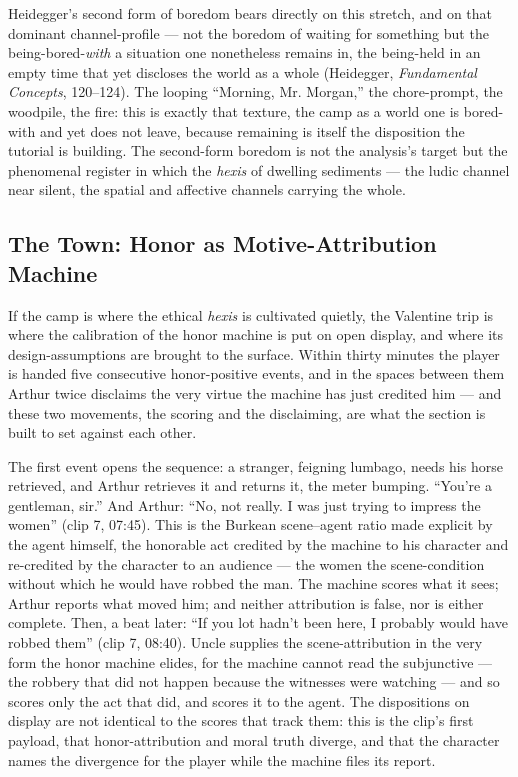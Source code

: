 \documentclass{article}
\begin{document}
Heidegger's second form of boredom bears directly on this stretch, and on that dominant channel-profile — not the boredom of waiting for something but the being-bored-\textit{with} a situation one nonetheless remains in, the being-held in an empty time that yet discloses the world as a whole (Heidegger, \textit{Fundamental Concepts}, 120–124). The looping ``Morning, Mr. Morgan,'' the chore-prompt, the woodpile, the fire: this is exactly that texture, the camp as a world one is bored-with and yet does not leave, because remaining is itself the disposition the tutorial is building. The second-form boredom is not the analysis's target but the phenomenal register in which the \textit{hexis} of dwelling sediments — the ludic channel near silent, the spatial and affective channels carrying the whole.

\bigskip

\subsection*{The Town: Honor as Motive-Attribution Machine}

If the camp is where the ethical \textit{hexis} is cultivated quietly, the Valentine trip is where the calibration of the honor machine is put on open display, and where its design-assumptions are brought to the surface. Within thirty minutes the player is handed five consecutive honor-positive events, and in the spaces between them Arthur twice disclaims the very virtue the machine has just credited him — and these two movements, the scoring and the disclaiming, are what the section is built to set against each other.

The first event opens the sequence: a stranger, feigning lumbago, needs his horse retrieved, and Arthur retrieves it and returns it, the meter bumping. ``You're a gentleman, sir.'' And Arthur: ``No, not really. I was just trying to impress the women'' (clip 7, 07:45). This is the Burkean scene–agent ratio made explicit by the agent himself, the honorable act credited by the machine to his character and re-credited by the character to an audience — the women the scene-condition without which he would have robbed the man. The machine scores what it sees; Arthur reports what moved him; and neither attribution is false, nor is either complete. Then, a beat later: ``If you lot hadn't been here, I probably would have robbed them'' (clip 7, 08:40). Uncle supplies the scene-attribution in the very form the honor machine elides, for the machine cannot read the subjunctive — the robbery that did not happen because the witnesses were watching — and so scores only the act that did, and scores it to the agent. The dispositions on display are not identical to the scores that track them: this is the clip's first payload, that honor-attribution and moral truth diverge, and that the character names the divergence for the player while the machine files its report.
\end{document}
